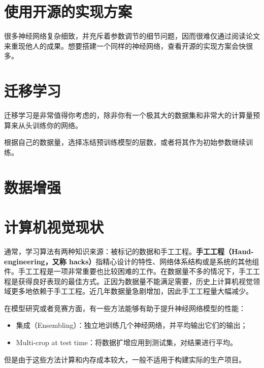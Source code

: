 \documentclass[../../main.tex]{subfiles}
\begin{document}
\begin{refsection}
\section{使用开源的实现方案}
很多神经网络复杂细致，并充斥着参数调节的细节问题，因而很难仅通过阅读论文来重现他人的成果。想要搭建一个同样的神经网络，查看开源的实现方案会快很多。

\section{迁移学习}
迁移学习是非常值得你考虑的，除非你有一个极其大的数据集和非常大的计算量预算来从头训练你的网络。

根据自己的数据量，选择冻结预训练模型的层数，或者将其作为初始参数继续训练。

\section{数据增强}

\section{计算机视觉现状}
通常，学习算法有两种知识来源：被标记的数据和手工工程。\textbf{手工工程（Hand-engineering，又称 hacks）}指精心设计的特性、网络体系结构或是系统的其他组件。手工工程是一项非常重要也比较困难的工作。在数据量不多的情况下，手工工程是获得良好表现的最佳方式。正因为数据量不能满足需要，历史上计算机视觉领域更多地依赖于手工工程。近几年数据量急剧增加，因此手工工程量大幅减少。

在模型研究或者竞赛方面，有一些方法能够有助于提升神经网络模型的性能：
\begin{itemize}
    \item 集成（Ensembling）：独立地训练几个神经网络，并平均输出它们的输出；
    \item Multi-crop at test time：将数据扩增应用到测试集，对结果进行平均。
\end{itemize}
但是由于这些方法计算和内存成本较大，一般不适用于构建实际的生产项目。

\printbibliography[heading=subbibliography]
\end{refsection}
\end{document}
